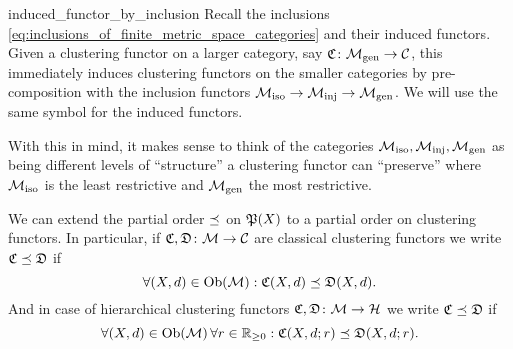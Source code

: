 \begin{myremark}{}{induced_functor_by_inclusion}
Recall the inclusions \eqref{eq:inclusions_of_finite_metric_space_categories} and their induced functors.
Given a clustering functor on a larger category, say $\Cf\colon \gen \to \C$, this immediately induces clustering functors on the smaller categories by pre-composition with the inclusion functors $\iso \to \inj \to \gen$. We will use the same symbol for the induced functors.
\end{myremark}

With this in mind, it makes sense to think of the categories $\iso, \inj, \gen$ as being different levels of ``structure'' a clustering functor can ``preserve'' where $\iso$ is the least restrictive and $\gen$ the most restrictive.


\begin{myremark}{}{}
We can extend the partial order $\refines$ on $\P(X)$ to a partial order on clustering functors.
In particular, if $\Cf, \mathfrak{D}\colon \M \to \C$ are classical clustering functors we write $\Cf \refines \mathfrak{D}$ if
\begin{equation*}
    \forall (X,d) \in \ob(\M): \Cf(X,d) \refines \mathfrak{D}(X,d).
\end{equation*}
And in case of hierarchical clustering functors $\Cf, \mathfrak{D}\colon \M \to \H$ we write $\Cf \refines \mathfrak{D}$ if
\begin{equation*}
    \forall (X,d) \in \ob(\M) \, \forall r \in \R_{\geq0}: \Cf(X,d;r) \refines \mathfrak{D}(X,d;r).
\end{equation*}
\end{myremark}